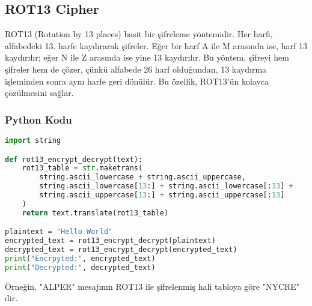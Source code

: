 \newpage

\subsection{ROT13 Cipher}

ROT13 (Rotation by 13 places) basit bir şifreleme yöntemidir. Her harfi, alfabedeki 13. harfe kaydırarak şifreler. Eğer bir harf A ile M arasında ise, harf 13 kaydırılır; eğer N ile Z arasında ise yine 13 kaydırılır. Bu yöntem, şifreyi hem şifreler hem de çözer, çünkü alfabede 26 harf olduğundan, 13 kaydırma işleminden sonra aynı harfe geri dönülür. Bu özellik, ROT13'ün kolayca çözülmesini sağlar.

\subsubsection{Python Kodu}

\begin{lstlisting}[language=Python]
import string

def rot13_encrypt_decrypt(text):
    rot13_table = str.maketrans(
        string.ascii_lowercase + string.ascii_uppercase,
        string.ascii_lowercase[13:] + string.ascii_lowercase[:13] +
        string.ascii_uppercase[13:] + string.ascii_uppercase[:13]
    )
    return text.translate(rot13_table)

plaintext = "Hello World"
encrypted_text = rot13_encrypt_decrypt(plaintext)
decrypted_text = rot13_encrypt_decrypt(encrypted_text)
print("Encrpyted:", encrypted_text)
print("Decrypted:", decrypted_text)
\end{lstlisting}

\begin{table}[ht]
\centering
{}
\end{table}

Örneğin, "ALPER" mesajının ROT13 ile şifrelenmiş hali tabloya göre "NYCRE" dir.


